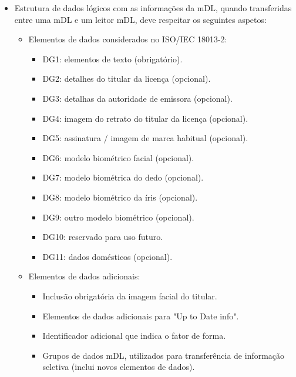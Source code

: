 \begin{itemize}
	\item Estrutura de dados lógicos com as informações da mDL, quando transferidas entre uma mDL e um leitor mDL, deve respeitar os seguintes aspetos:
	\begin{itemize}
		\item Elementos de dados considerados no ISO/IEC 18013-2:
		\begin{itemize}
			\item DG1: elementos de texto (obrigatório).
			\item DG2: detalhes do titular da licença (opcional).
			\item DG3: detalhas da autoridade de emissora (opcional).
			\item DG4: imagem do retrato do titular da licença (opcional).
			\item DG5: assinatura / imagem de marca habitual (opcional).
			\item DG6: modelo biométrico facial (opcional).
			\item DG7: modelo biométrica do dedo (opcional).
			\item DG8: modelo biométrico da íris (opcional).
			\item DG9: outro modelo biométrico (opcional).
			\item DG10: reservado para uso futuro.
			\item DG11: dados domésticos (opcional).
		\end{itemize}

		\item Elementos de dados adicionais:
		\begin{itemize}
			\item Inclusão obrigatória da imagem facial do titular.
			\item Elementos de dados adicionais para "Up to Date info".
			\item Identificador adicional que indica o fator de forma.
			\item Grupos de dados mDL, utilizados para transferência de informação seletiva (inclui novos elementos de dados).
		\end{itemize}
	\end{itemize}


\end{itemize}
